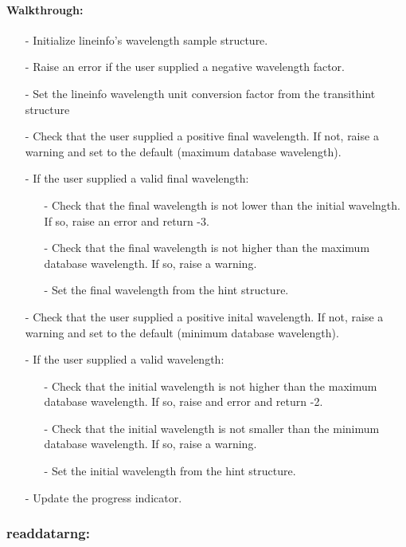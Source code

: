 \documentclass[letterpaper,12pt]{article}
\begin{document}
\paragraph{Walkthrough:}
\begin{enumerate}[leftmargin=10pt, noitemsep, parsep=0pt, topsep=0ex]
\item[-] Initialize lineinfo's wavelength sample structure.  
\item[-] Raise an error if the user supplied a negative wavelength factor.
\item[-] Set the lineinfo wavelength unit conversion factor from the transithint structure
\item[-] Check that the user supplied a positive final wavelength. If not, raise a warning and set to the default (maximum database wavelength).
\item[-] If the user supplied a valid final wavelength:
\begin{enumerate}[leftmargin=10pt, noitemsep, parsep=0pt, topsep=0ex]
\item[-] Check that the final wavelength is not lower than the initial wavelngth. If so, raise an error and return -3.
\item[-] Check that the final wavelength is not higher than the maximum database wavelength. If so, raise a warning.
\item[-] Set the final wavelength from the hint structure.
\end{enumerate}
\item[-] Check that the user supplied a positive inital wavelength. If not, raise a warning and set to the default (minimum database wavelength).
\item[-] If the user supplied a valid wavelength:
\begin{enumerate}[leftmargin=10pt, noitemsep, parsep=0pt, topsep=0ex]
\item[-] Check that the initial wavelength is not higher than the maximum database wavelength. If so, raise and error and return -2.
\item[-] Check that the initial wavelength is not smaller than the minimum database wavelength. If so, raise a warning.
\item[-] Set the initial wavelength from the hint structure.
\end{enumerate}
\item[-] Update the progress indicator.
\end{enumerate}

\subsubsection{readdatarng:}
\end{document}
